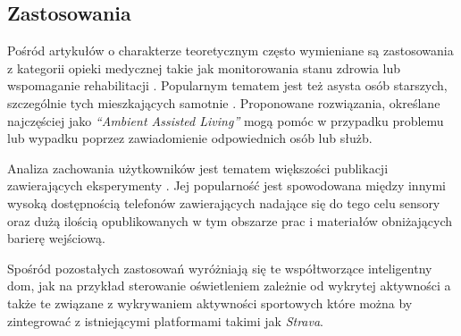 \subsection{Zastosowania}
Pośród artykułów o charakterze teoretycznym często wymieniane są zastosowania z kategorii opieki medycznej takie jak monitorowania stanu zdrowia \cite{S22} lub wspomaganie rehabilitacji \cite{S35}. Popularnym tematem jest też asysta osób starszych, szczególnie tych mieszkających samotnie \cite{S21}. Proponowane rozwiązania, określane najczęściej jako \textit{``Ambient Assisted Living''} mogą pomóc w przypadku problemu lub wypadku poprzez zawiadomienie odpowiednich osób lub służb.

Analiza zachowania użytkowników jest tematem większości publikacji zawierających eksperymenty \cite{S02, S59, S33}. Jej popularność jest spowodowana między innymi wysoką dostępnością telefonów zawierających nadające się do tego celu sensory oraz dużą ilością opublikowanych w tym obszarze prac i materiałów obniżających barierę wejściową.

Spośród pozostałych zastosowań wyróżniają się te współtworzące inteligentny dom, jak na przykład sterowanie oświetleniem zależnie od wykrytej aktywności \cite{S36} a także te związane z wykrywaniem aktywności sportowych \cite{S29} które można by zintegrować z istniejącymi platformami takimi jak \textit{Strava}.


